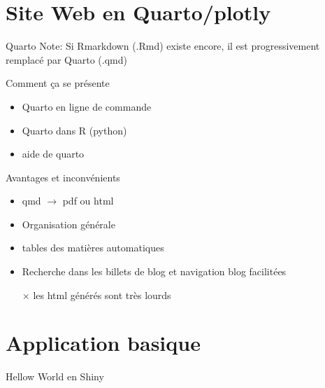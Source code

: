 \documentclass[pdftex,xcolor={table}]{beamer} %
\newcommand{\ra}[0]{$\rightarrow$ }
\newcommand{\cross}[0]{$\times$ } %
\begin{document}
\section{Site Web en Quarto/plotly}
  \begin{frame}{Quarto}
    Note: Si Rmarkdown (.Rmd) existe encore, il est progressivement remplacé par Quarto (.qmd)
    \begin{block}{Comment ça se présente}
      \begin{itemize}
        \item Quarto en ligne de commande
        \item Quarto dans R (python)
        \item aide de quarto
      \end{itemize}
    \end{block}
    \begin{block}{Avantages et inconvénients}
      \begin{itemize}
        \item qmd \ra pdf ou html
        \item Organisation générale 
        \item tables des matières automatiques
        \item Recherche dans les billets de blog et navigation blog facilitées
        \item[\cross] les html générés sont très lourds 
      \end{itemize}
    \end{block}
  \end{frame}
%     

\section{Application basique}
  \begin{frame}{Hellow World en Shiny}
    
  \end{frame}
\end{document}
